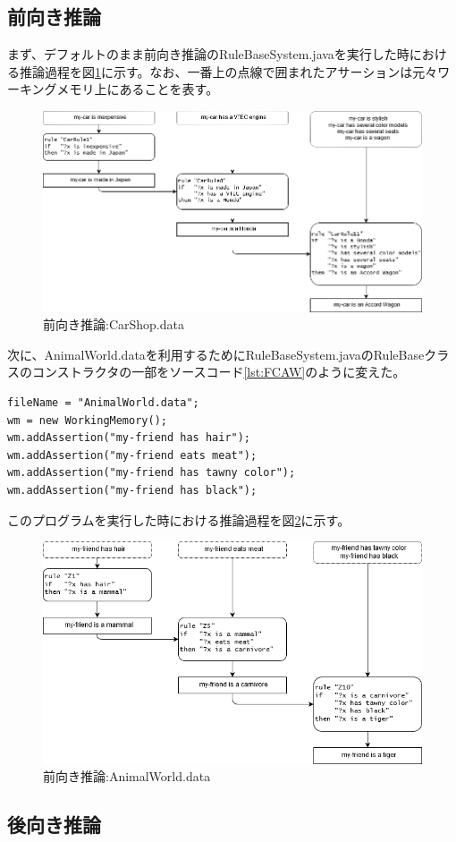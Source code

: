 \documentclass{jsarticle} %
\begin{document}
\subsection{前向き推論}

まず、デフォルトのまま前向き推論のRuleBaseSystem.javaを実行した時における推論過程を図\ref{fig:FCCS}に示す。なお、一番上の点線で囲まれたアサーションは元々ワーキングメモリ上にあることを表す。

 \begin{figure}[htbp]
\includegraphics[bb=0 0 401 532,width=0.48\linewidth]{Forward1.png}
\caption{前向き推論:CarShop.data}
\label{fig:FCCS}
\end{figure}

次に、AnimalWorld.dataを利用するためにRuleBaseSystem.javaのRuleBaseクラスのコンストラクタの一部をソースコード\ref{lst:FCAW}のように変えた。

  \begin{lstlisting}[caption=RuleBase2.java(一部抜粋),label=lst:FCAW]
fileName = "AnimalWorld.data";
wm = new WorkingMemory();
wm.addAssertion("my-friend has hair");
wm.addAssertion("my-friend eats meat");
wm.addAssertion("my-friend has tawny color");
wm.addAssertion("my-friend has black");
  \end{lstlisting}
  
このプログラムを実行した時における推論過程を図\ref{fig:FCAW}に示す。
 
\begin{figure}[htbp]
\includegraphics[bb=0 0 401 532,width=0.57\linewidth]{Forward2.png}
\caption{前向き推論:AnimalWorld.data}
\label{fig:FCAW}
\end{figure}

\pagebreak
\subsection{後向き推論}
\end{document}
